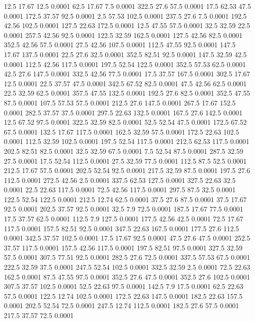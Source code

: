 12.5	17.67	12.5	0.0001
62.5	17.67	7.5	0.0001
322.5	27.6	57.5	0.0001
17.5	62.53	47.5	0.0001
172.5	37.57	92.5	0.0001
2.5	57.53	102.5	0.0001
237.5	27.6	7.5	0.0001
192.5	42.56	102.5	0.0001
127.5	22.63	172.5	0.0001
12.5	47.55	57.5	0.0001
32.5	32.59	22.5	0.0001
257.5	42.56	92.5	0.0001
122.5	32.59	162.5	0.0001
127.5	42.56	82.5	0.0001
352.5	42.56	57.5	0.0001
27.5	42.56	107.5	0.0001
112.5	47.55	92.5	0.0001
147.5	17.67	137.5	0.0001
22.5	27.6	32.5	0.0001
352.5	82.51	92.5	0.0001
147.5	32.59	42.5	0.0001
112.5	42.56	117.5	0.0001
197.5	52.54	122.5	0.0001
352.5	57.53	62.5	0.0001
42.5	27.6	147.5	0.0001
332.5	42.56	77.5	0.0001
17.5	37.57	167.5	0.0001
302.5	17.67	12.5	0.0001
22.5	37.57	47.5	0.0001
342.5	67.52	82.5	0.0001
47.5	42.56	62.5	0.0001
22.5	32.59	62.5	0.0001
357.5	47.55	132.5	0.0001
192.5	27.6	82.5	0.0001
352.5	47.55	87.5	0.0001
107.5	57.53	57.5	0.0001
212.5	27.6	147.5	0.0001
267.5	17.67	152.5	0.0001
282.5	37.57	37.5	0.0001
297.5	22.63	132.5	0.0001
167.5	27.6	142.5	0.0001
12.5	67.52	97.5	0.0001
322.5	32.59	82.5	0.0001
52.5	52.54	47.5	0.0001
172.5	67.52	67.5	0.0001
132.5	17.67	117.5	0.0001
162.5	32.59	57.5	0.0001
172.5	22.63	102.5	0.0001
112.5	32.59	102.5	0.0001
197.5	52.54	117.5	0.0001
212.5	62.53	117.5	0.0001
202.5	82.51	82.5	0.0001
32.5	32.59	67.5	0.0001
7.5	52.54	87.5	0.0001
287.5	32.59	27.5	0.0001
17.5	52.54	112.5	0.0001
27.5	32.59	77.5	0.0001
112.5	87.5	52.5	0.0001
212.5	17.67	57.5	0.0001
202.5	52.54	92.5	0.0001
217.5	32.59	87.5	0.0001
197.5	27.6	112.5	0.0001
272.5	42.56	2.5	0.0001
337.5	62.53	127.5	0.0001
327.5	22.63	32.5	0.0001
22.5	22.63	117.5	0.0001
72.5	42.56	117.5	0.0001
297.5	87.5	32.5	0.0001
122.5	52.54	122.5	0.0001
212.5	12.74	62.5	0.0001
37.5	27.6	87.5	0.0001
37.5	17.67	92.5	0.0001
202.5	37.57	92.5	0.0001
32.5	7.9	72.5	0.0001
187.5	17.67	77.5	0.0001
17.5	37.57	62.5	0.0001
112.5	7.9	127.5	0.0001
177.5	42.56	42.5	0.0001
72.5	17.67	117.5	0.0001
157.5	82.51	92.5	0.0001
347.5	22.63	167.5	0.0001
177.5	27.6	112.5	0.0001
342.5	37.57	102.5	0.0001
17.5	17.67	92.5	0.0001
47.5	27.6	47.5	0.0001
252.5	37.57	117.5	0.0001
157.5	42.56	117.5	0.0001
197.5	82.51	97.5	0.0001
327.5	32.59	57.5	0.0001
307.5	77.51	92.5	0.0001
282.5	27.6	72.5	0.0001
337.5	57.53	67.5	0.0001
222.5	32.59	37.5	0.0001
247.5	52.54	102.5	0.0001
332.5	32.59	2.5	0.0001
72.5	22.63	162.5	0.0001
87.5	47.55	97.5	0.0001
352.5	27.6	47.5	0.0001
352.5	27.6	102.5	0.0001
307.5	37.57	102.5	0.0001
52.5	22.63	97.5	0.0001
142.5	7.9	17.5	0.0001
62.5	22.63	57.5	0.0001
122.5	12.74	102.5	0.0001
172.5	22.63	147.5	0.0001
182.5	22.63	157.5	0.0001
202.5	52.54	72.5	0.0001
247.5	12.74	112.5	0.0001
182.5	27.6	57.5	0.0001
217.5	37.57	72.5	0.0001
